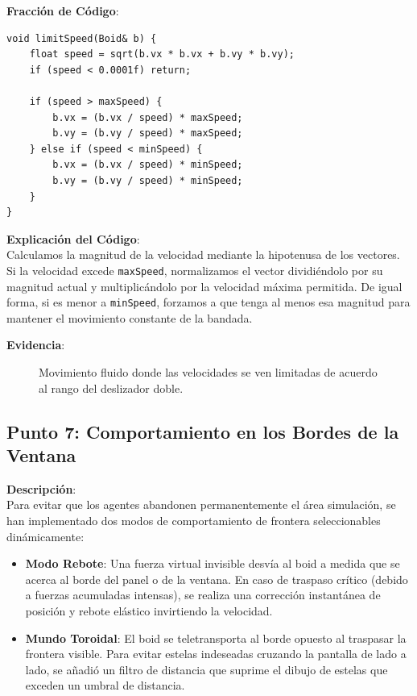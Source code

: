 \documentclass[11pt,a4paper]{article}
\begin{document}
\textbf{Fracción de Código}:
\begin{lstlisting}[caption={Ajuste de límites de velocidad en simulacion.cpp}, label={lst:limit_speed}]
void limitSpeed(Boid& b) {
    float speed = sqrt(b.vx * b.vx + b.vy * b.vy);
    if (speed < 0.0001f) return;

    if (speed > maxSpeed) {
        b.vx = (b.vx / speed) * maxSpeed;
        b.vy = (b.vy / speed) * maxSpeed;
    } else if (speed < minSpeed) {
        b.vx = (b.vx / speed) * minSpeed;
        b.vy = (b.vy / speed) * minSpeed;
    }
}
\end{lstlisting}

\textbf{Explicación del Código}: \\
Calculamos la magnitud de la velocidad mediante la hipotenusa de los vectores. Si la velocidad excede \lstinline{maxSpeed}, normalizamos el vector dividiéndolo por su magnitud actual y multiplicándolo por la velocidad máxima permitida. De igual forma, si es menor a \lstinline{minSpeed}, forzamos a que tenga al menos esa magnitud para mantener el movimiento constante de la bandada.

\textbf{Evidencia}:
\begin{figure}[htbp]
    \centering
    \caption{Movimiento fluido donde las velocidades se ven limitadas de acuerdo al rango del deslizador doble.}
    \label{fig:evidencia_punto6}
\end{figure}

\newpage

\subsection{Punto 7: Comportamiento en los Bordes de la Ventana}
\textbf{Descripción}: \\
Para evitar que los agentes abandonen permanentemente el área simulación, se han implementado dos modos de comportamiento de frontera seleccionables dinámicamente:
\begin{itemize}
    \item \textbf{Modo Rebote}: Una fuerza virtual invisible desvía al boid a medida que se acerca al borde del panel o de la ventana. En caso de traspaso crítico (debido a fuerzas acumuladas intensas), se realiza una corrección instantánea de posición y rebote elástico invirtiendo la velocidad.
    \item \textbf{Mundo Toroidal}: El boid se teletransporta al borde opuesto al traspasar la frontera visible. Para evitar estelas indeseadas cruzando la pantalla de lado a lado, se añadió un filtro de distancia que suprime el dibujo de estelas que exceden un umbral de distancia.
\end{itemize}
\end{document}
